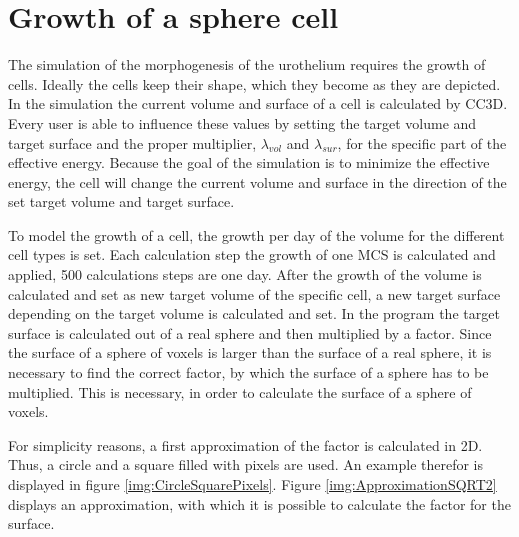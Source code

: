 \section{Growth of a sphere cell}\label{sec:GrowSphereCell}
The simulation of the morphogenesis of the urothelium requires the growth of cells. Ideally the cells keep their shape, which they become as they are depicted. \newline
In the simulation the current volume and surface of a cell is calculated by \ac{CC3D}. Every user is able to influence these values by setting the target volume and target surface and the proper multiplier, $\lambda_{vol}$ and $\lambda_{sur}$, for the specific part of the effective energy. Because the goal of the simulation is to minimize the effective energy, the cell will change the current volume and surface in the direction of the set target volume and target surface. 

To model the growth of a cell, the growth per day of the volume for the different cell types is set. Each calculation step the growth of one \ac{MCS} is calculated and applied, 500 calculations steps are one day. After the growth of the volume is calculated and set as new target volume of the specific cell, a new target surface depending on the target volume is calculated and set. \newline
In the program the target surface is calculated out of a real sphere and then multiplied by a factor.
Since the surface of a sphere of voxels is larger than the surface of a real sphere, it is necessary to find the correct factor, by which the surface of a sphere has to be multiplied. This is necessary, in order to calculate the surface of a sphere of voxels. 

For simplicity reasons, a first approximation of the factor is calculated in 2D. Thus, a circle and a square filled with pixels are used. An example therefor is displayed in figure \ref{img:CircleSquarePixels}. \newline
Figure \ref{img:ApproximationSQRT2} displays an approximation, with which it is possible to calculate the factor for the surface. 

